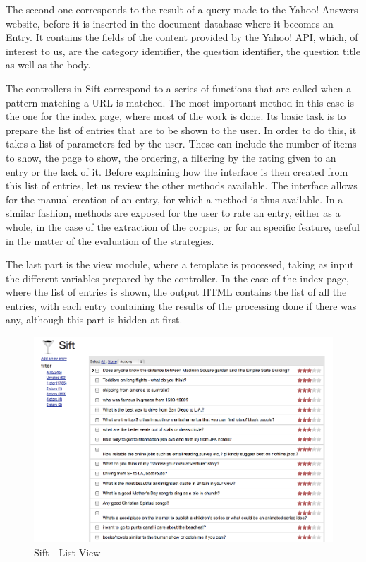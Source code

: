 The second one corresponds to the result of a query made to the Yahoo! Answers website, before it is inserted in the document database where it becomes an Entry. It contains the fields of the content provided by the Yahoo! API, which, of interest to us, are the category identifier, the question identifier, the question title as well as the body.

The controllers in Sift correspond to a series of functions that are called when a pattern matching a URL is matched. The most important method in this case is the one for the index page, where most of the work is done. Its basic task is to prepare the list of entries that are to be shown to the user. In order to do this, it takes a list of parameters fed by the user. These can include the number of items to show, the page to show, the ordering, a filtering by the rating given to an entry or the lack of it. Before explaining how the interface is then created from this list of entries, let us review the other methods available. The interface allows for the manual creation of an entry, for which a method is thus available. In a similar fashion, methods are exposed for the user to rate an entry, either as a whole, in the case of the extraction of the corpus, or for an specific feature, useful in the matter of the evaluation of the strategies.

The last part is the view module, where a template is processed, taking as input the different variables prepared by the controller. In the case of the index page, where the list of entries is shown, the output HTML contains the list of all the entries, with each entry containing the results of the processing done if there was any, although this part is hidden at first.

\begin{figure}[ht!]
  \begin{center}
    \includegraphics[width=\linewidth]{images/siftlist}
  \end{center}
  \caption{Sift - List View}\label{fig:sift_list}
\end{figure}


